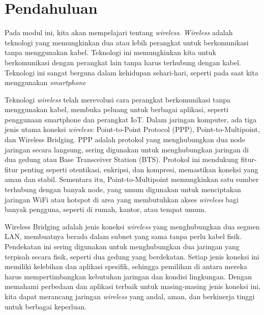 \section*{Pendahuluan}


Pada modul ini, kita akan mempelajari tentang \textit{wireless}. \textit{Wireless} adalah teknologi yang memungkinkan dua atau lebih perangkat untuk berkomunikasi tanpa menggunakan kabel. Teknologi ini memungkinkan kita untuk berkomunikasi dengan perangkat lain tanpa harus terhubung dengan kabel. Teknologi ini sangat berguna dalam kehidupan sehari-hari, seperti pada saat kita menggunakan \textit{smartphone}

Teknologi \textit{wireless} telah merevolusi cara perangkat berkomunikasi tanpa menggunakan kabel, membuka peluang untuk berbagai aplikasi, seperti penggunaan smartphone dan perangkat IoT. Dalam jaringan komputer, ada tiga jenis utama koneksi \textit{wireless}: Point-to-Point Protocol (PPP), Point-to-Multipoint, dan Wireless Bridging. PPP adalah protokol yang menghubungkan dua node jaringan secara langsung, sering digunakan untuk menghubungkan jaringan di dua gedung atau Base Transceiver Station (BTS). Protokol ini mendukung fitur-fitur penting seperti otentikasi, enkripsi, dan kompresi, memastikan koneksi yang aman dan stabil. Sementara itu, Point-to-Multipoint memungkinkan satu sumber terhubung dengan banyak node, yang umum digunakan untuk menciptakan jaringan WiFi atau hotspot di area yang membutuhkan akses \textit{wireless} bagi banyak pengguna, seperti di rumah, kantor, atau tempat umum.

Wireless Bridging adalah jenis koneksi \textit{wireless} yang menghubungkan dua segmen LAN, membuatnya berada dalam subnet yang sama tanpa perlu kabel fisik. Pendekatan ini sering digunakan untuk menghubungkan dua jaringan yang terpisah secara fisik, seperti dua gedung yang berdekatan. Setiap jenis koneksi ini memiliki kelebihan dan aplikasi spesifik, sehingga pemilihan di antara mereka harus mempertimbangkan kebutuhan jaringan dan kondisi lingkungan. Dengan memahami perbedaan dan aplikasi terbaik untuk masing-masing jenis koneksi ini, kita dapat merancang jaringan \textit{wireless} yang andal, aman, dan berkinerja tinggi untuk berbagai keperluan.